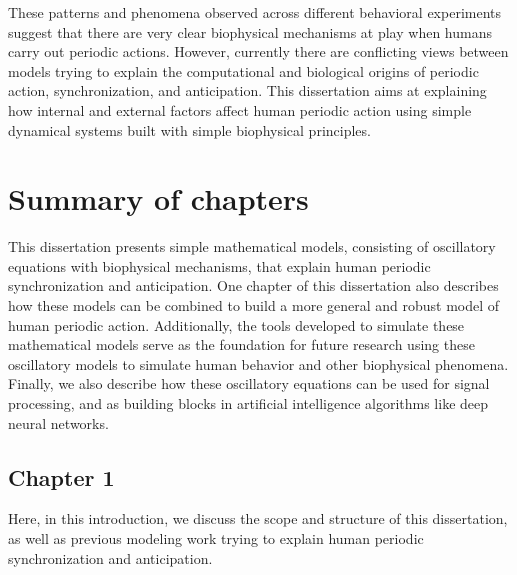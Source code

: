 \documentclass{report}
\begin{document}
These patterns and phenomena observed across different behavioral experiments suggest that there are very clear biophysical mechanisms at play when humans carry out periodic actions. However, currently there are conflicting views between models trying to explain the computational and biological origins of periodic action, synchronization, and anticipation. This dissertation aims at explaining how internal and external factors affect human periodic action using simple dynamical systems built with simple biophysical principles. 

\section{Summary of chapters}

This dissertation presents simple mathematical models, consisting of oscillatory equations with biophysical mechanisms, that explain human periodic synchronization and anticipation. One chapter of this dissertation also describes how these models can be combined to build a more general and robust model of human periodic action. Additionally, the tools developed to simulate these mathematical models serve as the foundation for future research using these oscillatory models to simulate human behavior and other biophysical phenomena. Finally, we also describe how these oscillatory equations can be used for signal processing, and as building blocks in artificial intelligence algorithms like deep neural networks.

\subsection{Chapter 1}
Here, in this introduction, we discuss the scope and structure of this dissertation, as well as previous modeling work trying to explain human periodic synchronization and anticipation.
\end{document}

